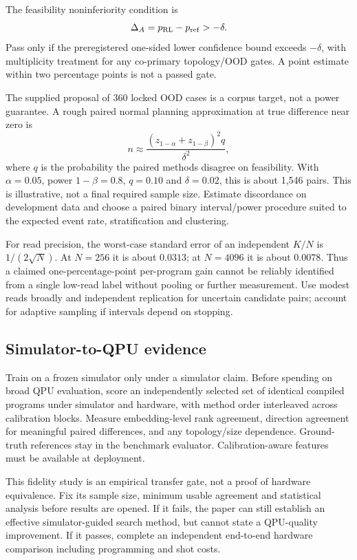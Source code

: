 The feasibility noninferiority condition is
\begin{equation}
\Delta_A=p_{\rm RL}-p_{\rm ref}>-\delta.
\end{equation}
Pass only if the preregistered one-sided lower confidence bound exceeds $-\delta$, with multiplicity treatment for any co-primary topology/OOD gates. A point estimate within two percentage points is not a passed gate.

The supplied proposal of 360 locked OOD cases is a corpus target, not a power guarantee. A rough paired normal planning approximation at true difference near zero is
\begin{equation}
n\approx\frac{(z_{1-\alpha}+z_{1-\beta})^2q}{\delta^2},
\end{equation}
where $q$ is the probability the paired methods disagree on feasibility. With $\alpha=0.05$, power $1-\beta=0.8$, $q=0.10$ and $\delta=0.02$, this is about 1,546 pairs. This is illustrative, not a final required sample size. Estimate discordance on development data and choose a paired binary interval/power procedure suited to the expected event rate, stratification and clustering.

For read precision, the worst-case standard error of an independent $K/N$ is $1/(2\sqrt N)$. At $N=256$ it is about $0.0313$; at $N=4096$ it is about $0.0078$. Thus a claimed one-percentage-point per-program gain cannot be reliably identified from a single low-read label without pooling or further measurement. Use modest reads broadly and independent replication for uncertain candidate pairs; account for adaptive sampling if intervals depend on stopping.

\subsection{Simulator-to-QPU evidence}
Train on a frozen simulator only under a simulator claim. Before spending on broad QPU evaluation, score an independently selected set of identical compiled programs under simulator and hardware, with method order interleaved across calibration blocks. Measure embedding-level rank agreement, direction agreement for meaningful paired differences, and any topology/size dependence. Ground-truth references stay in the benchmark evaluator. Calibration-aware features must be available at deployment.

This fidelity study is an empirical transfer gate, not a proof of hardware equivalence. Fix its sample size, minimum usable agreement and statistical analysis before results are opened. If it fails, the paper can still establish an effective simulator-guided search method, but cannot state a QPU-quality improvement. If it passes, complete an independent end-to-end hardware comparison including programming and shot costs.

